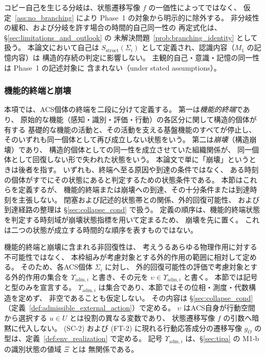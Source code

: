 \begin{definition}[時間的自己同一性の予備条件]
\medskip
コピー自己を生じる分岐は、状態遷移写像 $f$ の一価性によってではなく、
仮定~\ref{ass:no_branching} により Phase~1 の対象から明示的に除外する。
非分岐性の緩和、および分岐を許す場合の時間的自己同一性の
再定式化は、\S\ref{sec:limitations_and_outlook} の
未解決問題~\ref{prob:branching_identity} として扱う。
本論文において自己は $S_{\mathrm{struct}}(\Sigma_i)$
として定義され、認識内容（$M_1$ の記憶内容）は
構造的存続の判定に影響しない。
主観的自己・意識・記憶の同一性は Phase~1 の記述対象に
含まれない（under stated assumptions）。
\end{definition}

\subsubsection{機能的終端と崩壊}
\label{subsubsec:collapse_sec2}

本項では、ACS個体の終端を二段に分けて定義する。
第一は\emph{機能的終端}であり、
原始的な機能（感知・識別・評価・行動）の各区分に関して構造的個体が有する
基礎的な機能の活動と、その活動を支える基盤機能のすべてが停止し、
そのいずれも同一個体として再び成立しない状態をいう。
第二は\emph{崩壊}（構造崩壊）であり、
構造的個体としての同一性を成立させていた組織関係が、
同一個体として回復しない形で失われた状態をいう。
本論文で単に「崩壊」というときは後者を指す。
いずれも、終端へ至る原因や到達の条件ではなく、
ある時刻の個体がすでにその状態にあると判定するための状態条件である。
本節はこれらを定義するが、
機能的終端または崩壊への到達、その十分条件または到達時刻を主張しない。
閉塞および記述的状態帯との関係、外的回復可能性、
および到達経路の整理は \S\ref{sec:collapse_cond} で扱う。
定義の順序は、機能的終端状態を判定する時刻域が崩壊状態指標を用いて定まるため、
崩壊を先に置く。
これは二つの状態が成立する時間的な順序を表すものではない。

機能的終端と崩壊に含まれる非回復性は、
考えうるあらゆる物理作用に対する不可能性ではなく、
本枠組みが考慮対象とする外的作用の範囲に相対して定める。
そのため、各ACS個体 $\Sigma_i$ に対し、
外的回復可能性の評価で考慮対象とする外的作用の集合を
$\Upsilon_{\mathrm{adm},i}$ と書き、その元を
$\upsilon\in\Upsilon_{\mathrm{adm},i}$ と書く。
本節では記号と型のみを宣言する。
$\Upsilon_{\mathrm{adm},i}$ は集合であり、本節ではその位相・測度・代数構造を定めず、
非空であることも仮定しない。
その内容は \S\ref{sec:collapse_cond}（定義~\ref{def:admissible_external_action}）で定める。
$\upsilon$ はACS自身が行動空間から選択する $u\in U$ とは役割の異なる変数であり、
状態遷移写像 $f$ の引数へ暗黙に代入しない。
(SC-2) および (FT-2) に現れる行動応答成分の遷移写像 $g_O$ の型は、定義~\ref{def:env_realization} で定める。
記号 $\Upsilon_{\mathrm{adm},i}$ は、\S\ref{sec:tipa} の M1-b の識別状態の値域 $\Xi$ とは
無関係である。

